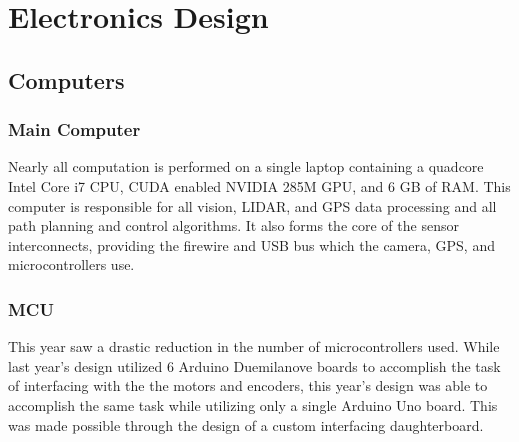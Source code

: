 \section{Electronics Design}

\subsection{Computers}

\subsubsection{Main Computer}

Nearly all computation is performed on a single laptop containing a quadcore Intel Core i7 CPU,
CUDA enabled NVIDIA 285M GPU, and 6 GB of RAM. This computer is responsible for all vision,
LIDAR, and GPS data processing and all path planning and control algorithms. It also forms 
the core of the sensor interconnects, providing the firewire and USB bus which the camera, GPS, and
microcontrollers use.

\subsubsection{MCU}

This year saw a drastic reduction in the number of microcontrollers used. While last year's design utilized 6 Arduino Duemilanove boards to accomplish the task of interfacing with the the motors and encoders, this year's design was able to accomplish the same task while utilizing only a single Arduino Uno board. This was made possible through the design of a custom interfacing daughterboard.

